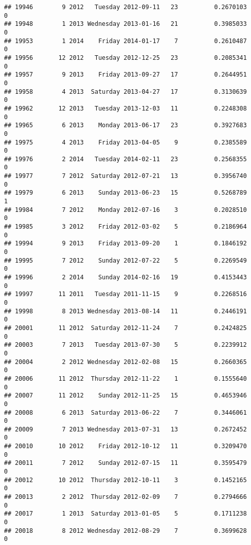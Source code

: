 \documentclass[
]{article}
\begin{document}
\begin{verbatim}
## 19946        9 2012   Tuesday 2012-09-11   23          0.2670103             0
## 19948        1 2013 Wednesday 2013-01-16   21          0.3985033             0
## 19953        1 2014    Friday 2014-01-17    7          0.2610487             0
## 19956       12 2012   Tuesday 2012-12-25   23          0.2085341             0
## 19957        9 2013    Friday 2013-09-27   17          0.2644951             0
## 19958        4 2013  Saturday 2013-04-27   17          0.3130639             0
## 19962       12 2013   Tuesday 2013-12-03   11          0.2248308             0
## 19965        6 2013    Monday 2013-06-17   23          0.3927683             0
## 19975        4 2013    Friday 2013-04-05    9          0.2385589             0
## 19976        2 2014   Tuesday 2014-02-11   23          0.2568355             0
## 19977        7 2012  Saturday 2012-07-21   13          0.3956740             0
## 19979        6 2013    Sunday 2013-06-23   15          0.5268789             1
## 19984        7 2012    Monday 2012-07-16    3          0.2028510             0
## 19985        3 2012    Friday 2012-03-02    5          0.2186964             0
## 19994        9 2013    Friday 2013-09-20    1          0.1846192             0
## 19995        7 2012    Sunday 2012-07-22    5          0.2269549             0
## 19996        2 2014    Sunday 2014-02-16   19          0.4153443             0
## 19997       11 2011   Tuesday 2011-11-15    9          0.2268516             0
## 19998        8 2013 Wednesday 2013-08-14   11          0.2446191             0
## 20001       11 2012  Saturday 2012-11-24    7          0.2424825             0
## 20003        7 2013   Tuesday 2013-07-30    5          0.2239912             0
## 20004        2 2012 Wednesday 2012-02-08   15          0.2660365             0
## 20006       11 2012  Thursday 2012-11-22    1          0.1555640             0
## 20007       11 2012    Sunday 2012-11-25   15          0.4653946             0
## 20008        6 2013  Saturday 2013-06-22    7          0.3446061             0
## 20009        7 2013 Wednesday 2013-07-31   13          0.2672452             0
## 20010       10 2012    Friday 2012-10-12   11          0.3209470             0
## 20011        7 2012    Sunday 2012-07-15   11          0.3595479             0
## 20012       10 2012  Thursday 2012-10-11    3          0.1452165             0
## 20013        2 2012  Thursday 2012-02-09    7          0.2794666             0
## 20017        1 2013  Saturday 2013-01-05    5          0.1711238             0
## 20018        8 2012 Wednesday 2012-08-29    7          0.3699628             0

\end{verbatim}
\end{document}
